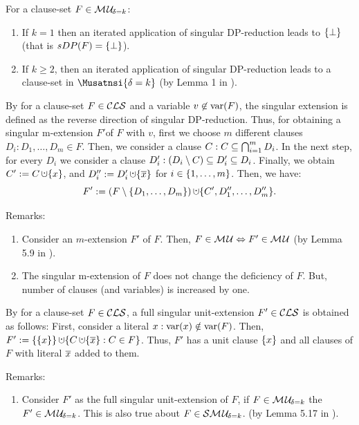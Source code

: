 \documentclass{report}
\begin{document}
\begin{lem}\label{lem:sDP-infl}
For a clause-set $F \in \mathcal{M\hspace{0.8pt}U}_{\!\delta=k}$:
  \begin{enumerate}
  \item If $k=1$ then an iterated application of singular DP-reduction leads to $\{ \bot \}$ (that is $sDP(F)=\{ \bot \}$).
  \item If $k \ge 2$, then an iterated application of singular DP-reduction leads to a clause-set in $\Musatnsi{\delta=k}$ (by Lemma 1 in \cite{h24}).
  \end{enumerate}
\end{lem} 

\begin{defi}\label{def:singularextn}
By \cite{h9} for a clause-set $F \in\mathcal{CLS}$ and a variable $v \not \in \operatorname{var}(F)$, the singular extension is defined as the reverse direction of singular DP-reduction. Thus, for obtaining a singular m-extension $F' $of $F$ with $v$, first we choose $m$ different clauses $D_i:D_1, \dots, D_m \in F$. Then, we consider a clause  $C: C \subseteq \bigcap_{i=1}^m D_i$. In the next step, for every $D_i$ we consider a clause $D_i':(D_i \setminus C) \subseteq D_i' \subseteq D_i$. Finally, we obtain $C' := C \addcup \set{x}$, and $D_i'' := D_i' \addcup \set{\ol{x}}$ for $i \in \{ 1, \dots, m \}$. Then, we have:
  \begin{displaymath}
    F' := (F \sm \set{D_1,\dots,D_m}) \addcup \set{C', D_1'',\dots,D_m''}.
  \end{displaymath}
\end{defi}
Remarks:
  \begin{enumerate}
  \item Consider an $m$-extension $F'$ of $F$. Then, $F \in \mathcal{M\hspace{0.8pt}U} \Leftrightarrow F' \in \mathcal{M\hspace{0.8pt}U}$ (by Lemma 5.9 in \cite{h9}).
  \item The singular m-extension of $F$ does not change the deficiency of $F$. But, number of clauses (and variables) is increased by one.
  \end{enumerate}
  
\begin{defi}\label{def:unit-ext}
By \cite{h9} for a clause-set $F \in \mathcal{CLS}$, a full singular unit-extension $F' \in \mathcal{CLS}$ is obtained as follows: First, consider a literal $x:\operatorname{var}(x) \notin \operatorname{var}(F)$. Then, $F' := \set{\set{x}} \addcup \set{C \addcup \set{\ol{x}} : C \in F}$. Thus, $F' $ has a unit clause $\{ x \}$ and all clauses of $F$ with literal $\overline{x}$ added to them.
\end{defi}
Remarks:
  \begin{enumerate}
  \item Consider $F'$ as the full singular unit-extension of $F$, if $F \in \mathcal{M\hspace{0.8pt}U}_{\!\delta=k} $ the  $F' \in \mathcal{M\hspace{0.8pt}U}_{\!\delta=k} $. This is also true about $F \in \mathcal{S}\mathcal{M\hspace{0.8pt}U}_{\!\delta=k}$. (by Lemma 5.17 in \cite{h9}).
  \end{enumerate}
\end{document}
